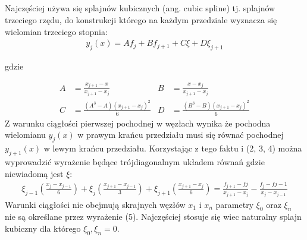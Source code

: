\documentclass[11pt]{extarticle}
\begin{document}
	\subsection{}
	Najczęściej używa się splajnów kubicznych (ang. cubic spline) tj. splajnów trzeciego rzędu, do konstrukcji którego na każdym przedziale wyznacza się wielomian trzeciego stopnia: 
	\begin{align}
		y_j(x) = A f_j + B f_{j+1} + C \xi + D \xi_{j+1}
	\end{align}
	\begin{center}
		gdzie
	\end{center}
	\begin{align}
		A &= \frac{x_{j+1} - x}{x_{j+1} - x_j} & B &= \frac{x - x_{j}}{x_{j+1} - x_j} \\[0.5cm]
		C &= \frac{(A^3-A)(x_{j+1}-x_j)^2}{6} & D &= \frac{(B^3-B)(x_{j+1}-x_j)^2}{6}
	\end{align}
	Z warunku ciągłości pierwszej pochodnej w węzłach wynika że pochodna wielomianu \(y_j(x)\) w prawym krańcu przedziału musi się równać pochodnej \(y_{j+1}(x)\) w lewym krańcu przedziału. Korzystając z tego faktu i (2, 3, 4) można wyprowadzić wyrażenie będące trójdiagonalnym układem równań gdzie niewiadomą jest \(\xi\):
	\begin{align}
		\xi_{j-1} \left( \frac{x_j - x_{j-1}}{6} \right) + 
		\xi_{j} \left( \frac{x_{j+1} - x_{j-1}}{3} \right) + 
		\xi_{j+1} \left( \frac{x_{j+1} - x_{j}}{6} \right) = 
		\frac{f_{j+1} - f{j}}{x_{j+1} - x_j} - 
		\frac{f_{j} - f{j-1}}{x_j - x_{j-1}}
	\end{align}
	Warunki ciągłości nie obejmują skrajnych węzłów \(x_1\) i \(x_n\) parametry \(\xi_0\) oraz \(\xi_n\) nie są określane przez wyrażenie (5). Najczęściej stosuje się wiec naturalny splajn kubiczny dla którego \(\xi_0, \xi_n = 0\).
\end{document}
